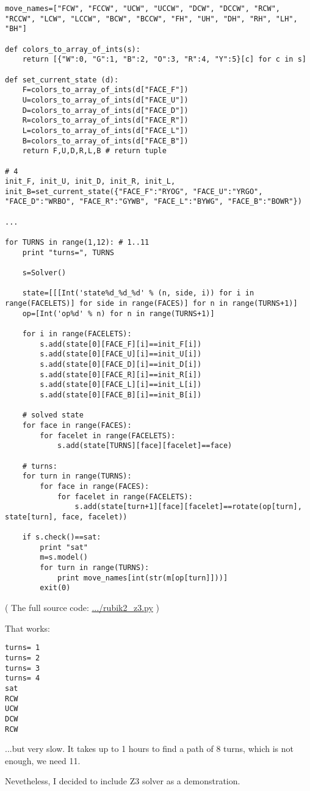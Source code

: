 \begin{lstlisting}
move_names=["FCW", "FCCW", "UCW", "UCCW", "DCW", "DCCW", "RCW", "RCCW", "LCW", "LCCW", "BCW", "BCCW", "FH", "UH", "DH", "RH", "LH", "BH"]

def colors_to_array_of_ints(s):
    return [{"W":0, "G":1, "B":2, "O":3, "R":4, "Y":5}[c] for c in s]

def set_current_state (d):
    F=colors_to_array_of_ints(d["FACE_F"])
    U=colors_to_array_of_ints(d["FACE_U"])
    D=colors_to_array_of_ints(d["FACE_D"])
    R=colors_to_array_of_ints(d["FACE_R"])
    L=colors_to_array_of_ints(d["FACE_L"])
    B=colors_to_array_of_ints(d["FACE_B"])
    return F,U,D,R,L,B # return tuple

# 4
init_F, init_U, init_D, init_R, init_L, init_B=set_current_state({"FACE_F":"RYOG", "FACE_U":"YRGO", "FACE_D":"WRBO", "FACE_R":"GYWB", "FACE_L":"BYWG", "FACE_B":"BOWR"})

...

for TURNS in range(1,12): # 1..11
    print "turns=", TURNS

    s=Solver()

    state=[[[Int('state%d_%d_%d' % (n, side, i)) for i in range(FACELETS)] for side in range(FACES)] for n in range(TURNS+1)]
    op=[Int('op%d' % n) for n in range(TURNS+1)]

    for i in range(FACELETS):
        s.add(state[0][FACE_F][i]==init_F[i])
        s.add(state[0][FACE_U][i]==init_U[i])
        s.add(state[0][FACE_D][i]==init_D[i])
        s.add(state[0][FACE_R][i]==init_R[i])
        s.add(state[0][FACE_L][i]==init_L[i])
        s.add(state[0][FACE_B][i]==init_B[i])

    # solved state
    for face in range(FACES):
        for facelet in range(FACELETS):
            s.add(state[TURNS][face][facelet]==face)

    # turns:
    for turn in range(TURNS):
        for face in range(FACES):
            for facelet in range(FACELETS):
                s.add(state[turn+1][face][facelet]==rotate(op[turn], state[turn], face, facelet))

    if s.check()==sat:
        print "sat"
        m=s.model()
        for turn in range(TURNS):
            print move_names[int(str(m[op[turn]]))]
        exit(0)
\end{lstlisting}

( The full source code: \url{.../rubik2_z3.py} )

That works:

\begin{lstlisting}
turns= 1
turns= 2
turns= 3
turns= 4
sat
RCW
UCW
DCW
RCW
\end{lstlisting}

...but very slow. It takes up to 1 hours to find a path of 8 turns, which is not enough, we need 11.

Nevetheless, I decided to include Z3 solver as a demonstration.

